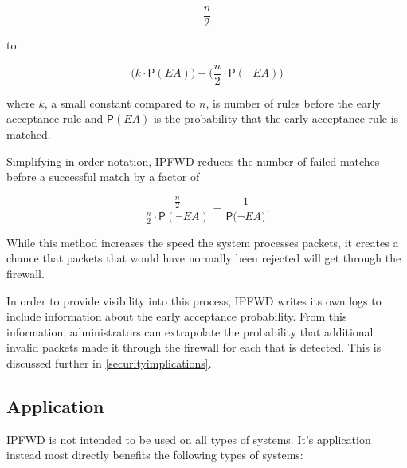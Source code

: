 \documentclass[journal]{IEEEtran}
\begin{document}
  \[
  \frac{n}{2}
  \]

  to

  \[
  \Big(k \cdot \mathsf{P}(\textit{EA})\Big) + 
  \Big(\frac{n}{2} \cdot \mathsf{P}(\neg{\textit{EA}})\Big) 
  \]

  where $k$, a small constant compared to $n$, is number of rules before the
  early acceptance rule and $\mathsf{P}(\textit{EA})$ is the probability that
  the early acceptance rule is matched.

  Simplifying in order notation, IPFWD reduces the number of failed matches before
  a successful match by a factor of

  \[
  \frac
      {\frac{n}{2}}
      {\frac{n}{2} \cdot \mathsf{P}(\neg{\textit{EA}})} 
  = \frac{1}{\mathsf{P}(\neg{\textit{EA})}}.
  \]

  While this method increases the speed the system processes packets, it
  creates a chance that packets that would have normally been rejected will get
  through the firewall.

  In order to provide visibility into this process, IPFWD writes its own logs
  to include information about the early acceptance probability. From this
  information, administrators can extrapolate the probability that additional
  invalid packets made it through the firewall for each that is detected. This
  is discussed further in \ref{securityimplications}.

  \subsection{Application}

    IPFWD is not intended to be used on all types of systems. It's application
    instead most directly benefits the following types of systems:
\end{document}
